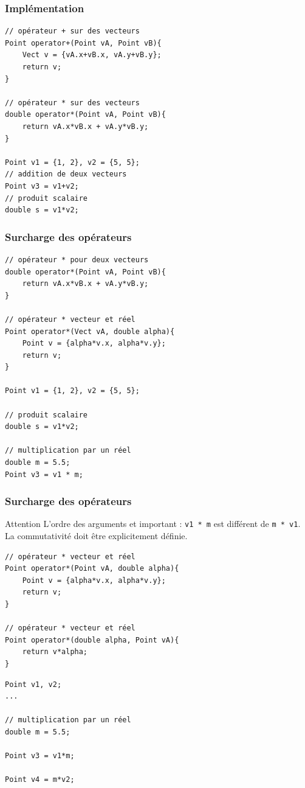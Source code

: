 \begin{frame}[fragile=singleslide]
\frametitle{Implémentation}
\begin{verbatim}
// opérateur + sur des vecteurs
Point operator+(Point vA, Point vB){
    Vect v = {vA.x+vB.x, vA.y+vB.y};
    return v;
}

// opérateur * sur des vecteurs
double operator*(Point vA, Point vB){
    return vA.x*vB.x + vA.y*vB.y;
}

Point v1 = {1, 2}, v2 = {5, 5};
// addition de deux vecteurs
Point v3 = v1+v2;
// produit scalaire
double s = v1*v2;
\end{verbatim}
\end{frame}

\begin{frame}[fragile=singleslide]
\frametitle{Surcharge des opérateurs}

\begin{verbatim}
// opérateur * pour deux vecteurs
double operator*(Point vA, Point vB){
    return vA.x*vB.x + vA.y*vB.y;
}

// opérateur * vecteur et réel
Point operator*(Vect vA, double alpha){
    Point v = {alpha*v.x, alpha*v.y};
    return v;
}

Point v1 = {1, 2}, v2 = {5, 5};

// produit scalaire
double s = v1*v2;

// multiplication par un réel
double m = 5.5;
Point v3 = v1 * m;
\end{verbatim}
\end{frame}

\begin{frame}[fragile=singleslide]
\frametitle{Surcharge des opérateurs}
\begin{alertblock}{Attention}
L'ordre des arguments et important : \texttt{v1 * m} est différent de \texttt{m * v1}. La commutativité doit être explicitement définie.
\end{alertblock}
\begin{minipage}{0.60\linewidth}
\begin{verbatim}
// opérateur * vecteur et réel
Point operator*(Point vA, double alpha){
    Point v = {alpha*v.x, alpha*v.y};
    return v;
}

// opérateur * vecteur et réel
Point operator*(double alpha, Point vA){
    return v*alpha;
}
\end{verbatim}
\end{minipage}%
\begin{minipage}{0.40\linewidth}
\begin{verbatim}
Point v1, v2;
...

// multiplication par un réel
double m = 5.5;

Point v3 = v1*m;

Point v4 = m*v2;
\end{verbatim}
\end{minipage}
\end{frame}


